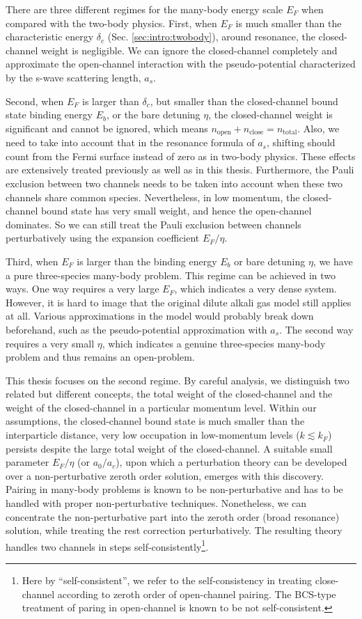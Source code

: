There are three different regimes for the many-body energy scale $E_F$ when compared with the two-body physics.  
First, when $E_F$ is much smaller than the characteristic energy $\delta_c$ (Sec. \ref{sec:intro:twobody}), around resonance, the closed-channel weight is negligible. We can ignore the closed-channel completely and approximate the open-channel interaction with the pseudo-potential characterized by the s-wave scattering length, $a_s$. 

Second, when $E_F$ is larger than $\delta_c$, but smaller than the closed-channel bound state binding energy $E_b$, or the bare detuning $\eta$, the closed-channel weight is significant and cannot be ignored, which means $n_{\text{open}}+n_{\text{close}}=n_{\text{total}}$. Also, we need to take into account that in the resonance formula of $a_s$, shifting should count from the Fermi surface instead of zero as in two-body physics.    These effects are  extensively treated previously \cite{GurarieNarrow} as well as in this thesis.  Furthermore, the Pauli exclusion between two channels needs to be taken into account when these two channels share common species.  Nevertheless, in  low momentum, the closed-channel bound state has very small weight, and hence the open-channel dominates.  So we can still treat the Pauli exclusion between channels perturbatively using the expansion coefficient  $E_F/\eta$.  

Third, when $E_F$ is larger than the binding energy $E_b$ or bare detuning $\eta$, we have a pure three-species many-body problem. This regime can be achieved in two ways.  One way requires a very large $E_F$, which indicates a very dense system.  However, it is hard to image that  the original dilute alkali gas model still applies at all. Various approximations in the model would probably break down beforehand, such as the pseudo-potential approximation with $a_s$. The second way requires a very small $\eta$, which indicates a genuine three-species many-body problem and thus remains an open-problem.   

This thesis focuses on the second regime.  By careful analysis, we distinguish two related but different concepts, the total weight of the closed-channel  and the weight of the closed-channel in a particular momentum level.  
       Within our assumptions, the closed-channel bound state is much smaller than the interparticle distance, very low occupation in low-momentum levels ($k\lesssim{}k_{F}$) persists despite the large total weight of the closed-channel.     A suitable small parameter $E_F/\eta$ (or $a_0/a_c$), upon which a perturbation theory can be developed over a non-perturbative zeroth order solution, emerges with this discovery.  Pairing in many-body problems is known to be  non-perturbative and has to be handled with proper non-perturbative techniques.  Nonetheless, we can concentrate the non-perturbative part into the zeroth order  (broad resonance) solution, while treating the rest correction perturbatively.   The resulting theory  handles two channels in steps self-consistently\footnote{Here by ``self-consistent'', we refer to the self-consistency in treating close-channel according to zeroth order of open-channel pairing.  The BCS-type treatment of paring in open-channel   is known to be not self-consistent. }. 
       
